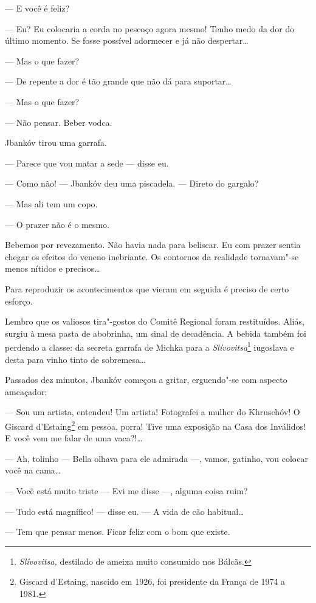 --- E você é feliz?

--- Eu? Eu colocaria a corda no pescoço agora mesmo! Tenho medo \label{ref01}
da dor do último momento. Se fosse possível adormecer e já não
despertar\ldots{}

--- Mas o que fazer?

--- De repente a dor é tão grande que não dá para suportar\ldots{}

--- Mas o que fazer?

--- Não pensar. Beber vodca.

Jbankóv tirou uma garrafa.

--- Parece que vou matar a sede --- disse eu.

--- Como não! --- Jbankóv deu uma piscadela. ---
Direto do gargalo?

--- Mas ali tem um copo.

--- O prazer não é o mesmo.

Bebemos por revezamento. Não havia nada para beliscar. Eu com prazer
sentia chegar os efeitos do veneno inebriante. Os contornos da realidade
tornavam"-se menos nítidos e precisos\ldots{}

\bigskip

Para reproduzir os acontecimentos que vieram em seguida é preciso de
certo esforço.

Lembro que os valiosos tira"-gostos do Comitê Regional foram restituídos.
Aliás, surgiu à mesa pasta de abobrinha, um sinal de decadência. A
bebida também foi perdendo a classe: da secreta garrafa de Michka para a
\emph{Slívovitsa}\footnote{\emph{Slívovitsa,} destilado de ameixa muito
  consumido nos Bálcãs.} iugoslava e desta para vinho tinto de
sobremesa\ldots{}

Passados dez minutos, Jbankóv começou a gritar, erguendo"-se com aspecto
ameaçador:

--- Sou um artista, entendeu! Um artista! Fotografei a mulher do
Khruschóv! O Giscard d'Estaing\footnote{Giscard d'Estaing, nascido em
  1926, foi presidente da França de 1974 a 1981.} em pessoa, porra! Tive
uma exposição na Casa dos Inválidos! E você vem me falar de uma
vaca?!\ldots{}

--- Ah, tolinho --- Bella olhava para ele admirada
---, vamos, gatinho, vou colocar você na cama\ldots{}

--- Você está muito triste --- Evi me disse ---,
alguma coisa ruim?

--- Tudo está magnífico! --- disse eu. --- A vida
de cão habitual\ldots{}

--- Tem que pensar menos. Ficar feliz com o bom que existe.


